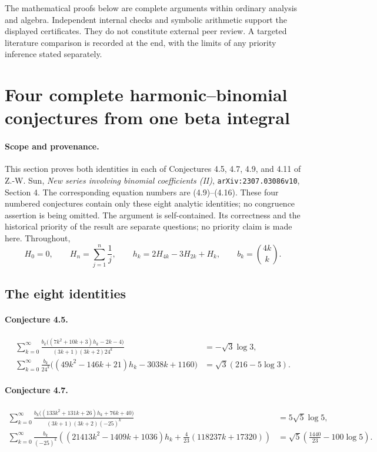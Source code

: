 \documentclass[11pt,a4paper]{article}
\theoremstyle{remark}\newtheorem{remark}[theorem]{Remark}
\numberwithin{equation}{section}
\begin{document}
The mathematical proofs below are complete arguments within ordinary
analysis and algebra. Independent internal checks and symbolic arithmetic
support the displayed certificates. They do not constitute external
peer review. A targeted literature comparison is recorded at the end,
with the limits of any priority inference stated separately.
\tableofcontents
\clearpage
\section{Four complete harmonic--binomial conjectures from one beta integral}
\label{sec:four-beta-closures}

\paragraph{Scope and provenance.}
This section proves both identities in each of Conjectures 4.5, 4.7, 4.9,
and 4.11 of Z.-W. Sun, \emph{New series involving binomial coefficients (II)},
\texttt{arXiv:2307.03086v10}, Section 4.
The corresponding equation numbers are (4.9)--(4.16).
These four numbered conjectures contain only these eight analytic identities;
no congruence assertion is being omitted.
The argument is self-contained. Its correctness and the historical priority
of the result are separate questions; no priority claim is made here.
Throughout,
\[
 H_0=0,\qquad H_n=\sum_{j=1}^n\frac1j,
 \qquad h_k=2H_{4k}-3H_{2k}+H_k,\qquad b_k=\binom{4k}{k}.
\]

\subsection{The eight identities}

\paragraph{Conjecture 4.5.}
\begin{align}
 \sum_{k=0}^{\infty}
 \frac{b_k\bigl((7k^2+10k+3)h_k-2k-4\bigr)}
 {(3k+1)(3k+2)24^k}
 &=-\sqrt3\log3, \label{eq:beta-sun49}\\
 \sum_{k=0}^{\infty}\frac{b_k}{24^k}
 \bigl((49k^2-146k+21)h_k-3038k+1160\bigr)
 &=\sqrt3(216-5\log3). \label{eq:beta-sun410}
\end{align}
\paragraph{Conjecture 4.7.}
\begin{align}
 \sum_{k=0}^{\infty}
 \frac{b_k\bigl((133k^2+131k+26)h_k+76k+40\bigr)}
 {(3k+1)(3k+2)(-25)^k}
 &=5\sqrt5\log5, \label{eq:beta-sun411}\\
 \sum_{k=0}^{\infty}\frac{b_k}{(-25)^k}
 \left((21413k^2-1409k+1036)h_k+
 \frac4{23}(118237k+17320)\right)
 &=\sqrt5\left(\frac{1440}{23}-100\log5\right).
 \label{eq:beta-sun412}
\end{align}
\end{document}
